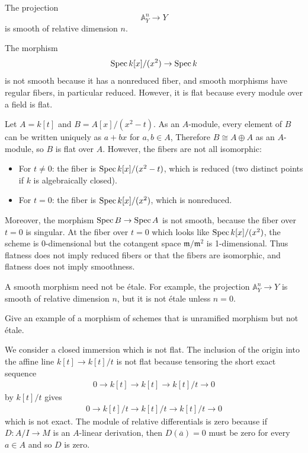 \documentclass[12pt]{article}
\begin{document}
\begin{example}
    The projection
    \[
        \mathbb A^n_Y \to Y
    \]
    is smooth of relative dimension $n$.
\end{example}

\begin{example}
    The morphism
    \[
        \operatorname{Spec} k[x]/(x^2) \to \operatorname{Spec} k
    \]
    is not smooth because it has a nonreduced fiber, and smooth morphisms have regular fibers, in particular reduced. However, it is flat because every module over a field is flat.
\end{example}


\begin{example}
    Let $A=k[t]$ and $B=A[x]/(x^2-t)$. As an $A$-module, every element of $B$ can be written uniquely as $a+bx$ for $a,b\in A$, Therefore $B \cong A \oplus A$ as an $A$-module, so $B$ is flat over $A$. However, the fibers are not all isomorphic:
    \begin{itemize}
        \item For $t \neq 0$: the fiber is $\operatorname{Spec} k[x]/(x^2 - t)$, which is reduced (two distinct points if $k$ is algebraically closed).
        \item For $t = 0$: the fiber is $\operatorname{Spec} k[x]/(x^2)$, which is nonreduced.
    \end{itemize}
    Moreover, the morphism $\operatorname{Spec} B \to \operatorname{Spec} A$ is not smooth, because the fiber over $t=0$ is singular. At the fiber over $t=0$ which looks like $\operatorname{Spec} k[x]/(x^2)$, the scheme is $0$-dimensional but the cotangent space $\mathfrak m/\mathfrak m^2$ is 1-dimensional.
    Thus flatness does not imply reduced fibers or that the fibers are isomorphic, and flatness does not imply smoothness.
\end{example}

\begin{example}
    A smooth morphism need not be étale. For example, the projection $\mathbb A^n_Y \to Y$ is smooth of relative dimension $n$, but it is not étale unless $n=0$.
\end{example}

\begin{exercise}
Give an example of a morphism of schemes that is unramified morphism but not étale.
\end{exercise}

\begin{solution}
    We consider a closed immersion which is not flat. The inclusion of the origin into the affine line $k[t]\to k[t]/t$ is not flat because tensoring the short exact sequence \begin{align*}
        0 \to k[t] \to k[t] \to k[t]/t \to 0
    \end{align*} by $k[t]/t$ gives
    \begin{align*}
        0 \to k[t]/t \to k[t]/t \to k[t]/t \to 0
    \end{align*}which is not exact. The module of relative differentials is zero because if $D:A/I \to M$ is an $A$-linear derivation, then $D(\overline{a})=0$ must be zero for every $a\in A$ and so $D$ is zero.
\end{solution}
\end{document}
